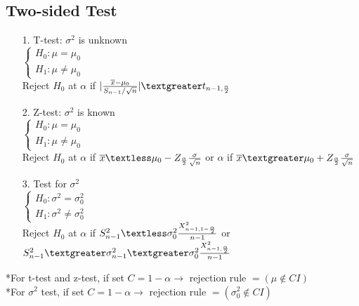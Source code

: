 \documentclass{article}
\begin{document}
\subsection{Two-sided Test}
\begin{itemize}
    \item [1. ] T-test: $\sigma^2$ is unknown\\
    $\begin{cases}
        H_0:\mu = \mu_0\\
        H_1:\mu \neq \mu_0
    \end{cases}$\\
    Reject $H_0$ at $\alpha$ if $|\frac{\overline{x}-\mu_0}{S_{n-1}/\sqrt{n}}| \textgreater t_{n-1, \frac{\alpha}{2}}$
    \item[2.] Z-test: $\sigma^2$ is known\\
    $\begin{cases}
        H_0:\mu = \mu_0\\
        H_1: \mu \neq \mu_0
    \end{cases}$\\
    Reject $H_0$ at $\alpha$ if $\overline{x} \textless \mu_0 -Z_{\frac{\alpha}{2}}\frac{\sigma}{\sqrt{n}}$ or $\alpha$ if $\overline{x} \textgreater \mu_0 +Z_{\frac{\alpha}{2}}\frac{\sigma}{\sqrt{n}}$
    \item[3.] Test for $\sigma^2$\\
    $\begin{cases}
        H_0: \sigma^2 = \sigma^2_0\\
        H_1: \sigma^2 \neq \sigma^2_0
    \end{cases}$\\
    Reject $H_0$ at $\alpha$ if $S^2_{n-1} \textless \sigma^2_0 \frac{X^2_{n-1,1-\frac{\alpha}{2}}}{n-1}$ or $S^2_{n-1} \textgreater \sigma^2_{n-1} \textgreater \sigma^2_0 \frac{X^2_{n-1,\frac{\alpha}{2}}}{n-1}$
\end{itemize}
*For t-test and z-test, if set $C=1-\alpha \rightarrow$ rejection rule $=(\mu \notin CI)$\\
*For $\sigma^2$ test, if set $C=1-\alpha \rightarrow$ rejection rule $=(\sigma^2_0 \notin CI)$
\end{document}
